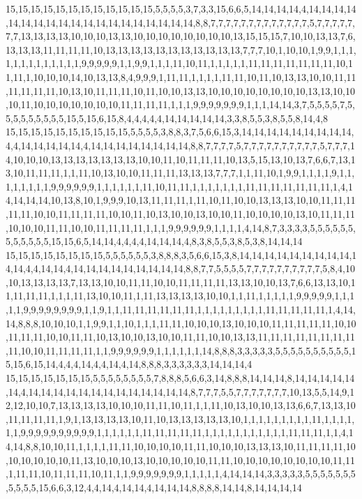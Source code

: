 15,15,15,15,15,15,15,15,15,15,15,15,5,5,5,5,3,7,3,3,15,6,6,5,14,14,14,14,4,14,14,14,14,14,14,14,14,14,14,14,14,14,14,14,14,14,14,14,8,8,7,7,7,7,7,7,7,7,7,7,7,7,7,5,7,7,7,7,7,7,7,13,13,13,13,10,10,10,13,13,10,10,10,10,10,10,10,10,13,15,15,15,7,10,10,13,13,7,6,13,13,13,11,11,11,11,10,13,13,13,13,13,13,13,13,13,13,13,7,7,7,10,1,10,10,1,9,9,1,1,1,1,1,1,1,1,1,1,1,1,1,9,9,9,9,9,1,1,9,9,1,1,1,11,10,11,1,1,1,1,1,11,11,11,11,11,11,11,10,11,11,1,10,10,10,14,10,13,13,8,4,9,9,9,1,11,11,1,1,1,1,11,11,10,11,10,13,13,10,10,11,11,11,11,11,11,10,13,10,11,11,11,10,11,10,10,13,13,10,10,10,10,10,10,10,10,13,13,10,10,10,11,10,10,10,10,10,10,10,11,11,11,11,1,1,1,9,9,9,9,9,9,9,1,1,1,14,14,3,7,5,5,5,5,7,5,5,5,5,5,5,5,5,5,15,5,15,6,15,8,4,4,4,4,4,14,14,14,14,14,3,3,8,5,5,3,8,5,5,8,14,4,8
15,15,15,15,15,15,15,15,15,15,5,5,5,5,3,8,8,3,7,5,6,6,15,3,14,14,14,14,14,14,14,14,14,4,4,14,14,14,14,14,4,14,14,14,14,14,14,14,14,8,8,7,7,7,7,5,7,7,7,7,7,7,7,7,7,7,5,7,7,7,14,10,10,10,13,13,13,13,13,13,13,10,10,11,10,11,11,11,10,13,5,15,13,10,13,7,6,6,7,13,13,10,11,11,11,1,1,11,10,13,10,10,11,11,11,13,13,13,7,7,7,1,1,11,10,1,9,9,1,1,1,1,9,1,1,1,1,1,1,1,1,9,9,9,9,9,9,1,1,1,1,1,1,11,10,11,11,1,1,1,1,1,1,1,11,11,11,11,11,11,11,1,4,14,14,14,14,10,13,8,10,1,9,9,9,10,13,11,11,11,1,11,10,11,10,10,13,13,13,10,10,11,11,11,11,11,10,10,11,11,11,11,10,10,11,10,13,10,10,13,10,10,11,10,10,10,10,13,10,11,11,11,10,10,10,11,11,10,10,11,11,11,11,1,1,1,9,9,9,9,9,9,1,1,1,1,4,14,8,7,3,3,3,3,5,5,5,5,5,5,5,5,5,5,5,5,15,15,6,5,14,14,4,4,4,4,14,14,14,4,8,3,8,5,5,3,8,5,3,8,14,14,14
15,15,15,15,15,15,15,15,5,5,5,5,5,5,3,8,8,8,3,5,6,6,15,3,8,14,14,14,14,14,14,14,14,14,14,14,4,4,14,14,4,14,14,14,14,14,14,14,14,14,8,8,7,7,5,5,5,5,7,7,7,7,7,7,7,7,7,7,5,8,4,10,10,13,13,13,13,7,13,13,10,10,11,11,10,10,11,11,11,11,13,13,10,10,13,7,6,6,13,13,10,11,11,11,11,1,1,1,11,13,10,10,11,1,11,13,13,13,13,10,10,1,1,11,1,1,1,1,1,9,9,9,9,9,1,1,1,1,1,9,9,9,9,9,9,9,9,1,1,9,1,1,11,11,11,11,11,11,1,1,1,1,1,1,1,1,1,11,11,11,11,11,1,4,14,14,8,8,8,10,10,10,1,1,9,9,1,1,10,1,1,1,11,11,10,10,10,13,10,10,10,11,11,11,11,11,10,10,11,11,11,10,10,11,11,10,13,10,10,13,10,10,11,11,10,10,13,13,11,11,11,11,11,11,11,11,11,10,10,11,11,11,11,1,1,9,9,9,9,9,9,1,1,1,1,1,1,14,8,8,8,3,3,3,3,3,5,5,5,5,5,5,5,5,5,5,15,15,6,15,14,4,4,4,14,4,4,14,4,14,8,8,8,3,3,3,3,3,3,14,14,14,4
15,15,15,15,15,15,15,5,5,5,5,5,5,5,5,7,8,8,8,5,6,6,3,14,8,8,8,14,14,14,8,14,14,14,14,14,14,4,14,14,14,14,14,14,14,14,14,14,14,14,14,8,7,7,7,5,5,7,7,7,7,7,7,7,10,13,5,5,14,9,12,12,10,10,7,13,13,13,13,10,10,10,11,11,10,11,1,1,11,10,13,10,10,13,13,6,6,7,13,13,10,11,11,11,11,1,9,1,13,13,13,13,10,11,10,13,13,13,13,13,10,1,1,1,1,1,1,1,1,1,11,1,1,1,1,1,1,9,9,9,9,9,9,9,9,9,9,1,1,1,1,1,1,11,11,11,11,11,1,1,1,1,1,1,1,1,1,1,1,11,11,11,1,1,4,14,14,8,8,10,10,11,1,1,1,1,11,11,10,10,10,10,11,11,10,10,10,13,13,13,10,11,11,11,11,10,10,10,10,10,10,11,13,10,10,10,13,10,10,10,10,10,11,11,10,10,10,10,10,10,10,10,11,11,1,11,11,10,11,11,11,10,11,1,1,9,9,9,9,9,9,9,1,1,1,1,1,4,14,14,14,3,3,3,3,3,5,5,5,5,5,5,5,5,5,5,5,15,6,6,3,12,4,4,14,4,14,14,4,14,14,14,8,8,8,8,14,14,8,14,14,14,14
